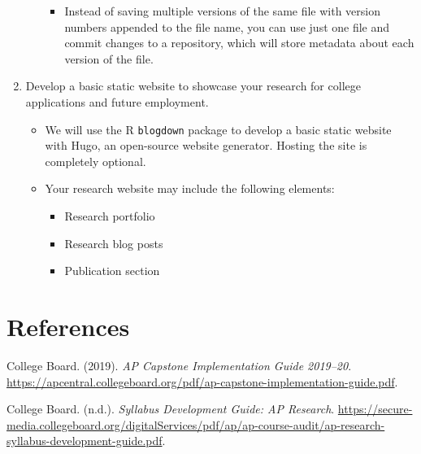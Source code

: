 \documentclass[11pt,]{article}
\providecommand{\tightlist}{%
  \setlength{\itemsep}{0pt}\setlength{\parskip}{0pt}}
\begin{document}
\begin{enumerate}
\begin{itemize}
    \begin{itemize}
    \tightlist
    \item
      Instead of saving multiple versions of the same file with version numbers appended to the file name, you can use just one file and commit changes to a repository, which will store metadata about each version of the file.
    \end{itemize}
  \end{itemize}
\item
  Develop a basic static website to showcase your research for college applications and future employment.

  \begin{itemize}
  \tightlist
  \item
    We will use the R \texttt{blogdown} package to develop a basic static website with Hugo, an open-source website generator. Hosting the site is completely optional.
  \item
    Your research website may include the following elements:

    \begin{itemize}
    \tightlist
    \item
      Research portfolio
    \item
      Research blog posts
    \item
      Publication section
      \newpage
    \end{itemize}
  \end{itemize}
\end{enumerate}

\hypertarget{references}{%
\section*{References}\label{references}}

\setlength{\parindent}{-0.2in}
\setlength{\leftskip}{0.2in}
\setlength{\parskip}{8pt}

\noindent

\hypertarget{refs}{}
\leavevmode\hypertarget{ref-cb}{}%
College Board. (2019). \emph{AP Capstone Implementation Guide 2019--20}. \url{https://apcentral.collegeboard.org/pdf/ap-capstone-implementation-guide.pdf}.

\leavevmode\hypertarget{ref-syllabus}{}%
College Board. (n.d.). \emph{Syllabus Development Guide: AP Research}. \url{https://secure-media.collegeboard.org/digitalServices/pdf/ap/ap-course-audit/ap-research-syllabus-development-guide.pdf}.

\printindex
\end{document}
